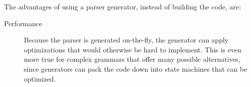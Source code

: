 
The advantages of using a parser generator, instead of building the code, are:
\begin{description}
	\item[Performance] Because the parser is generated on-the-fly, the generator can apply optimizations that would otherwise be hard to implement.
		This is even more true for complex grammars that offer many possible alternatives, since generators can pack the code down into state machines that can be optimized.
\end{description}



